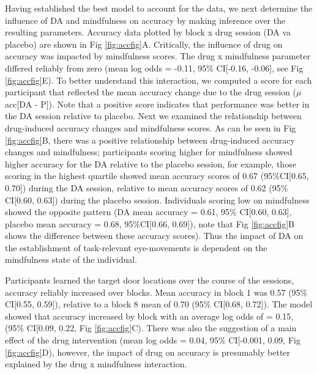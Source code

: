 \documentclass{article}
\begin{document}
Having established the best model to account for the data, we next
determine the influence of DA and mindfulness on accuracy by making
inference over the resulting parameters. Accuracy data plotted by block
x drug session (DA va placebo) are shown in Fig \ref{fig:accfig}A.
Critically, the influence of drug on accuracy was impacted by
mindfulness scores. The drug x mindfulness parameter differed reliably
from zero (mean log odds = -0.11, 95\% CI{[}-0.16, -0.06{]}, see Fig
\ref{fig:accfig}E). To better understand this interaction, we computed a
score for each participant that reflected the mean accuracy change due
to the drug session (\(\mu\) acc{[}DA - P{]}). Note that a positive
score indicates that performance was better in the DA session relative
to placebo. Next we examined the relationship between drug-induced
accuracy changes and mindfulness scores. As can be seen in Fig
\ref{fig:accfig}B, there was a positive relationship between
drug-induced accuracy changes and mindfulness; participants scoring
higher for mindfulness showed higher accuracy for the DA relative to the
placebo session, for example, those scoring in the highest quartile
showed mean accuracy scores of 0.67 (95\%CI{[}0.65, 0.70{]}) during the
DA session, relative to mean accuracy scores of 0.62 (95\% CI{[}0.60,
0.63{]}) during the placebo session. Individuals scoring low on
mindfulness showed the opposite pattern (DA mean accuracy = 0.61, 95\%
CI{[}0.60, 0.63{]}, placebo mean accuracy = 0.68, 95\%CI{[}0.66,
0.69{]}), note that Fig \ref{fig:accfig}B shows the difference between
these accuracy scores). Thus the impact of DA on the establishment of
task-relevant eye-movements is dependent on the mindfulness state of the
individual.

Participants learned the target door locations over the course of the
sessions, accuracy reliably increased over blocks. Mean accuracy in
block 1 was 0.57 (95\% CI{[}0.55, 0.59{]}), relative to a block 8 mean
of 0.70 (95\% CI{[}0.68, 0.72{]}). The model showed that accuracy
increased by block with an average log odds of = 0.15, (95\% CI{[}0.09,
0.22, Fig \ref{fig:accfig}C). There was also the suggestion of a main
effect of the drug intervention (mean log odds = 0.04, 95\% CI{[}-0.001,
0.09, Fig \ref{fig:accfig}D), however, the impact of drug on accuracy is
presumably better explained by the drug x mindfulness interaction.
\end{document}
